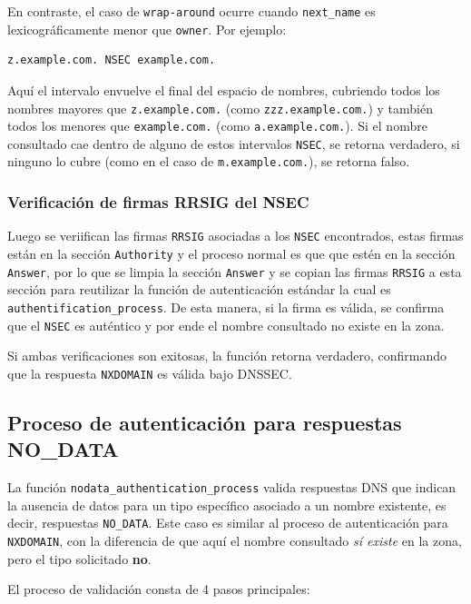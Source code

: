 En contraste, el caso de \texttt{wrap-around} ocurre cuando \texttt{next\_name} es lexicográficamente menor que \texttt{owner}.  
Por ejemplo:

\begin{verbatim}
z.example.com. NSEC example.com.
\end{verbatim}

Aquí el intervalo envuelve el final del espacio de nombres, cubriendo todos los nombres mayores que \texttt{z.example.com.} (como \texttt{zzz.example.com.}) y también todos los menores que
\texttt{example.com.} (como \texttt{a.example.com.}).  Si el nombre consultado cae dentro de alguno de estos intervalos \texttt{NSEC}, se retorna verdadero, si ninguno lo cubre (como en el caso
de \texttt{m.example.com.}), se retorna falso.



\subsubsection{Verificación de firmas RRSIG del NSEC}
Luego se veriifican las firmas \texttt{RRSIG} asociadas a los \texttt{NSEC} encontrados, estas firmas están en la sección \texttt{Authority} y el proceso normal es que
que estén en la sección \texttt{Answer}, por lo que se limpia la sección \texttt{Answer} y se copian las firmas \texttt{RRSIG} a esta sección para reutilizar la función de autenticación estándar
la cual es \texttt{authentification\_process}. De esta manera, si la firma es válida, se confirma que el \texttt{NSEC} es auténtico y por ende el nombre consultado no existe en la zona.


Si ambas verificaciones son exitosas, la función retorna verdadero, confirmando que la respuesta \texttt{NXDOMAIN} es válida bajo DNSSEC.

\subsection{Proceso de autenticación para respuestas NO\_DATA}

La función \texttt{nodata\_authentication\_process} valida respuestas DNS que indican la ausencia de datos para un tipo específico asociado a un nombre existente, es decir, respuestas \texttt{NO\_DATA}.
Este caso es similar al proceso de autenticación para \texttt{NXDOMAIN}, con la diferencia de que aquí el nombre consultado \emph{sí existe} en la zona, pero el tipo solicitado \textbf{no}.

El proceso de validación consta de 4 pasos principales:

